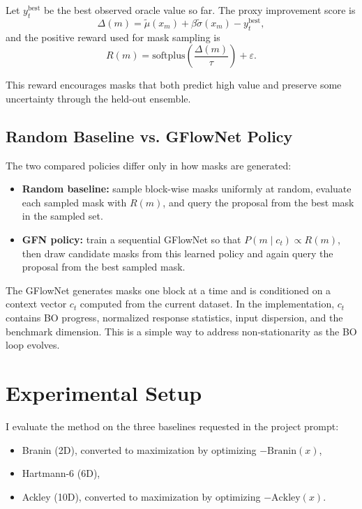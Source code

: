 \documentclass{article}
\begin{document}
Let $y_t^{\mathrm{best}}$ be the best observed oracle value so far. The proxy improvement score is
\[
\Delta(m) = \tilde\mu(x_m) + \beta \tilde\sigma(x_m) - y_t^{\mathrm{best}},
\]
and the positive reward used for mask sampling is
\[
R(m) = \mathrm{softplus}\!\left(\frac{\Delta(m)}{\tau}\right) + \varepsilon.
\]

This reward encourages masks that both predict high value and preserve some uncertainty through the held-out ensemble.

\subsection{Random Baseline vs. GFlowNet Policy}

The two compared policies differ only in how masks are generated:

\begin{itemize}
    \item \textbf{Random baseline:} sample block-wise masks uniformly at random, evaluate each sampled mask with $R(m)$, and query the proposal from the best mask in the sampled set.
    \item \textbf{GFN policy:} train a sequential GFlowNet so that $P(m \mid c_t) \propto R(m)$, then draw candidate masks from this learned policy and again query the proposal from the best sampled mask.
\end{itemize}

The GFlowNet generates masks one block at a time and is conditioned on a context vector $c_t$ computed from the current dataset. In the implementation, $c_t$ contains BO progress, normalized response statistics, input dispersion, and the benchmark dimension. This is a simple way to address non-stationarity as the BO loop evolves.

\section{Experimental Setup}

I evaluate the method on the three baselines requested in the project prompt:

\begin{itemize}
    \item Branin (2D), converted to maximization by optimizing $-\mathrm{Branin}(x)$,
    \item Hartmann-6 (6D),
    \item Ackley (10D), converted to maximization by optimizing $-\mathrm{Ackley}(x)$.
\end{itemize}
\end{document}
